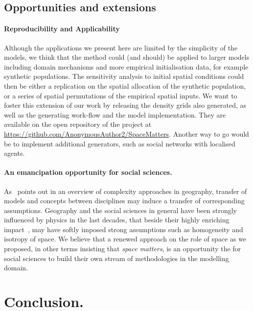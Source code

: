 \documentclass[preprint,5p,times,twocolumn,authoryear]{elsarticle}
\begin{document}
\subsection{Opportunities and extensions}


\paragraph{Reproducibility and Applicability} 


Although the applications we present here are limited by the simplicity of the models, we think that the method could (and should) be applied to larger models including domain mechanisms and more empirical initialisation data, for example synthetic populations. The sensitivity analysis to initial spatial conditions could then be either a replication on the spatial allocation of the synthetic population, or a series of spatial permutations of the empirical spatial inputs.
We want to foster this extension of our work by releasing the density grids also generated, as well as the generating work-flow and the model implementation. They are available on the open repository of the project at \url{https://github.com/AnonymousAuthor2/SpaceMatters}. Another way to go would be to implement additional generators, such as social networks \citep{alizadeh2016generating} with localised agents. 


\paragraph{An emancipation opportunity for social sciences.}


As~\citet{pumain2003approche} points out in an overview of complexity approaches in geography, transfer of models and concepts between disciplines may induce a transfer of corresponding assumptions. Geography and the social sciences in general have been strongly influenced by physics in the last decades, that beside their highly enriching impact~\citep{o2015physicists}, may have softly imposed strong assumptions such as homogeneity and isotropy of space. We believe that a renewed approach on the role of space as we proposed, in other terms insisting that \emph{space matters}, is an opportunity the for social sciences to build their own stream of methodologies in the modelling domain.





\section{Conclusion.}
\end{document}
